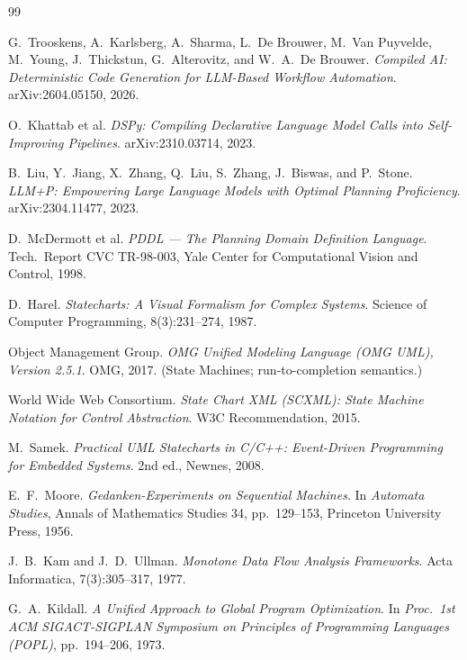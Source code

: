 \documentclass[11pt]{article}
\theoremstyle{plain}
\theoremstyle{definition}
\theoremstyle{remark}
\begin{document}
\begin{thebibliography}{99}

 G.~Trooskens, A.~Karlsberg, A.~Sharma, L.~De Brouwer,
M.~Van Puyvelde, M.~Young, J.~Thickstun, G.~Alterovitz, and W.~A.~De Brouwer.
\emph{Compiled AI: Deterministic Code Generation for LLM-Based Workflow
Automation}. arXiv:2604.05150, 2026.

 O.~Khattab et al.
\emph{DSPy: Compiling Declarative Language Model Calls into Self-Improving
Pipelines}. arXiv:2310.03714, 2023.

 B.~Liu, Y.~Jiang, X.~Zhang, Q.~Liu, S.~Zhang, J.~Biswas, and
P.~Stone. \emph{LLM+P: Empowering Large Language Models with Optimal Planning
Proficiency}. arXiv:2304.11477, 2023.

 D.~McDermott et al.
\emph{PDDL --- The Planning Domain Definition Language}.
Tech.\ Report CVC TR-98-003, Yale Center for Computational Vision and Control, 1998.

 D.~Harel.
\emph{Statecharts: A Visual Formalism for Complex Systems}.
Science of Computer Programming, 8(3):231--274, 1987.

 Object Management Group.
\emph{OMG Unified Modeling Language (OMG UML), Version 2.5.1}.
OMG, 2017. (State Machines; run-to-completion semantics.)

 World Wide Web Consortium.
\emph{State Chart XML (SCXML): State Machine Notation for Control Abstraction}.
W3C Recommendation, 2015.

 M.~Samek.
\emph{Practical UML Statecharts in C/C++: Event-Driven Programming for Embedded
Systems}. 2nd ed., Newnes, 2008.

 E.~F.~Moore.
\emph{Gedanken-Experiments on Sequential Machines}.
In \emph{Automata Studies}, Annals of Mathematics Studies 34, pp.~129--153,
Princeton University Press, 1956.

 J.~B.~Kam and J.~D.~Ullman.
\emph{Monotone Data Flow Analysis Frameworks}.
Acta Informatica, 7(3):305--317, 1977.

 G.~A.~Kildall.
\emph{A Unified Approach to Global Program Optimization}.
In \emph{Proc.\ 1st ACM SIGACT-SIGPLAN Symposium on Principles of Programming
Languages (POPL)}, pp.~194--206, 1973.


\end{thebibliography}
\end{document}
